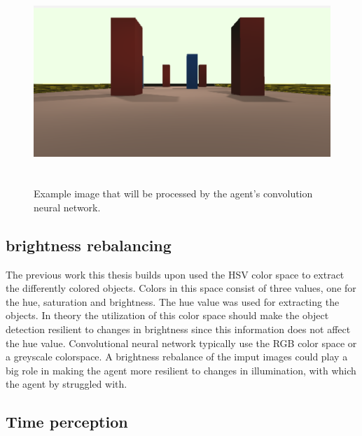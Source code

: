
\begin{figure}[h!]
     \centering
     \includegraphics[height=7cm]{Bilder/agent_input_image.png}\\[2.5ex]
     \caption{Example image that will be processed by the agent's convolution neural network.}
     \label{input_image}
\end{figure}



\subsection{brightness rebalancing}

The previous work this thesis builds upon used the HSV color space to extract the differently colored objects. Colors in this space consist of three values, one for the hue, saturation and brightness. The hue value was used for extracting the objects. In theory the utilization of this color space should make the object detection resilient to changes in brightness since this information does not affect the hue value.
Convolutional neural network typically use the RGB color space or a greyscale colorspace. A brightness rebalance of the imput images could play a big role in making the agent more resilient to changes in illumination, with which the agent by \autocite{maximilian} struggled with.


\subsection{Time perception}

